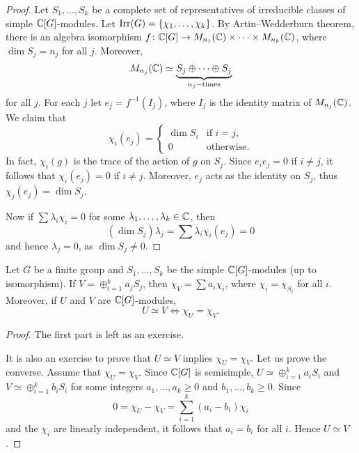\begin{proof}
    Let $S_1,\dots,S_k$ be a complete set of representatives of 
    irreducible classes of 
    simple $\mathbb{C}[G]$-modules. Let 
    $\operatorname{Irr}(G)=\{\chi_1,\dots,\chi_k\}$. 
    By Artin--Wedderburn theorem, there is 
    an algebra isomorphism 
    $f\colon \mathbb{C}[G]\to M_{n_1}(\mathbb{C})\times\cdots\times M_{n_k}(\mathbb{C})$, 
    where $\dim S_j=n_j$ for all $j$. Moreover, 
    \[
    M_{n_j}(\mathbb{C})\simeq \underbrace{S_j\oplus\cdots\oplus S_j}_{n_j-\text{times}}
    \]
    for all $j$. For each $j$ let $e_j=f^{-1}(I_j)$, where
    $I_j$ is the identity matrix of $M_{n_j}(\mathbb{C})$. We claim that 
    \[
        \chi_i(e_j)=\begin{cases}
            \dim S_i & \text{if $i=j$,}\\
            0 & \text{otherwise}.
            \end{cases}
    \]
    In fact, $\chi_i(g)$ is the trace of the action of $g$ on $S_j$. Since 
    $e_ie_j=0$ if $i\ne j$, it follows that 
    $\chi_i(e_j)=0$ if $i\ne j$. Moreover, $e_j$ acts as the identity on $S_j$, thus
    $\chi_j(e_j)=\dim S_j$. 
    
    Now if $\sum\lambda_i\chi_i=0$ for some $\lambda_1,\dots,\lambda_k\in\mathbb{C}$, then
    \[
    (\dim S_j)\lambda_j=\sum\lambda_i\chi_i(e_j)=0
    \]
    and hence $\lambda_j=0$, as $\dim S_j\ne 0$. 
\end{proof}

\begin{theorem}
    Let $G$ be a finite group and $S_1,\dots,S_k$ be the simple
    $\mathbb{C}[G]$-modules (up to isomorphism). If $V=\oplus_{i=1}^k a_jS_j$, then
    $\chi_V=\sum a_i\chi_i$, where 
    $\chi_i=\chi_{S_i}$ for all $i$. Moreover, if $U$ and $V$ 
    are $\mathbb{C}[G]$-modules, 
    \[
    U\simeq V\Longleftrightarrow \chi_U=\chi_V.
    \]
\end{theorem}

\begin{proof}
    The first part is left as an exercise. 
    
    It is also an exercise to prove that $U\simeq V$ implies $\chi_U=\chi_V$. Let us prove
    the converse. Assume that $\chi_U=\chi_V$. Since $\mathbb{C}[G]$ is semisimple, 
    $U\simeq\oplus_{i=1}^k a_iS_i$ and 
    $V\simeq\oplus_{i=1}^k b_iS_i$ for some integers 
    $a_1,\dots,a_k\geq0$ and $b_1,\dots,b_k\geq0$. Since 
    \[
    0=\chi_U-\chi_V=\sum_{i=1}^k (a_i-b_i)\chi_i
    \]
    and the $\chi_i$ are linearly independent, it follows that
    $a_i=b_i$ for all $i$. Hence $U\simeq V$. 
\end{proof}

